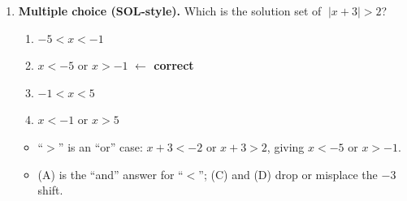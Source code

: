 \documentclass[10pt]{article}
\begin{document}
\begin{enumerate}[leftmargin=1.8em, itemsep=12pt]
  \item \textbf{Multiple choice (SOL-style).} Which is the solution set of $\;|x + 3| > 2$?
        \begin{enumerate}[label=(\Alph*), leftmargin=1.8em, itemsep=2pt]
          \item $-5 < x < -1$
          \item $x < -5 \text{ or } x > -1$ \quad\textcolor{keyred}{\textbf{$\leftarrow$ correct}}
          \item $-1 < x < 5$
          \item $x < -1 \text{ or } x > 5$
        \end{enumerate}
        \begin{itemize}[leftmargin=1.4em, nosep]
          \item ``$>$'' is an ``or'' case: $x+3 < -2$ or $x+3 > 2$, giving $x<-5$ or $x>-1$.
          \item (A) is the ``and'' answer for ``$<$''; (C) and (D) drop or misplace the $-3$ shift.
        \end{itemize}
\end{enumerate}
\end{document}
